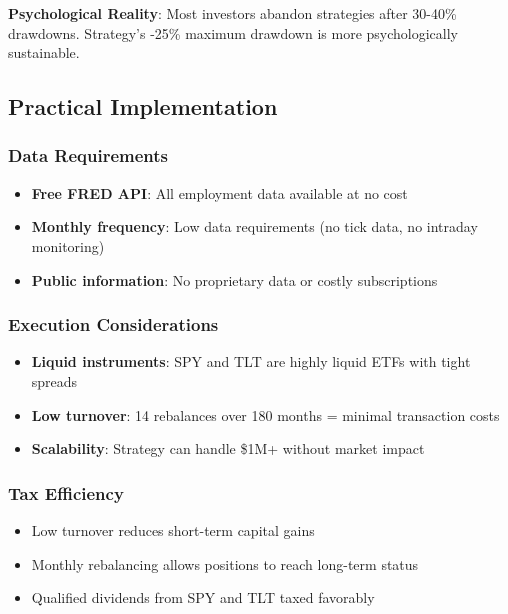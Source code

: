 \documentclass[12pt,a4paper]{article}
\begin{document}
\textbf{Psychological Reality}: Most investors abandon strategies after 30-40\% drawdowns. Strategy's -25\% maximum drawdown is more psychologically sustainable.

\subsection{Practical Implementation}

\subsubsection{Data Requirements}

\begin{itemize}
    \item \textbf{Free FRED API}: All employment data available at no cost
    \item \textbf{Monthly frequency}: Low data requirements (no tick data, no intraday monitoring)
    \item \textbf{Public information}: No proprietary data or costly subscriptions
\end{itemize}

\subsubsection{Execution Considerations}

\begin{itemize}
    \item \textbf{Liquid instruments}: SPY and TLT are highly liquid ETFs with tight spreads
    \item \textbf{Low turnover}: 14 rebalances over 180 months = minimal transaction costs
    \item \textbf{Scalability}: Strategy can handle \$1M+ without market impact
\end{itemize}

\subsubsection{Tax Efficiency}

\begin{itemize}
    \item Low turnover reduces short-term capital gains
    \item Monthly rebalancing allows positions to reach long-term status
    \item Qualified dividends from SPY and TLT taxed favorably
\end{itemize}
\end{document}
